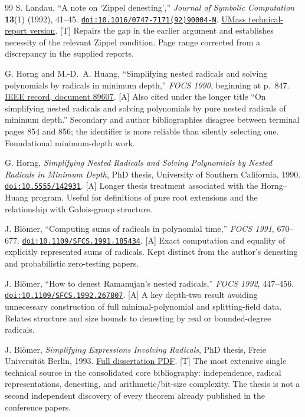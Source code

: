 \documentclass[11pt,a4paper]{article}
\numberwithin{equation}{section}
\theoremstyle{definition}\newtheorem{definition}[theorem]{Definition}
\theoremstyle{remark}\newtheorem{remark}[theorem]{Remark}
\newcommand{\doi}[1]{\href{https://doi.org/#1}{\nolinkurl{doi:#1}}}
\newcommand{\access}[2]{\href{#1}{#2}}
\newcommand{\status}[1]{\textsf{\footnotesize[#1]}}
\begin{document}
\begin{thebibliography}{99}
 S. Landau, ``A note on `Zippel denesting','' \emph{Journal of Symbolic Computation} \textbf{13}(1) (1992), 41--45. \doi{10.1016/0747-7171(92)90004-N}.
\access{https://web.cs.umass.edu/publication/docs/1990/UM-CS-1990-120.pdf}{UMass technical-report version}. \status{T}
Repairs the gap in the earlier argument and establishes necessity of the relevant Zippel condition. Page range corrected from a discrepancy in the supplied reports.

 G. Horng and M.-D.~A. Huang, ``Simplifying nested radicals and solving polynomials by radicals in minimum depth,'' \emph{FOCS 1990}, beginning at p.~847.
\access{https://ieeexplore.ieee.org/document/89607/}{IEEE record, document 89607}. \status{A}
Also cited under the longer title ``On simplifying nested radicals and solving polynomials by pure nested radicals of minimum depth.'' Secondary and author bibliographies disagree between terminal pages 854 and 856; the identifier is more reliable than silently selecting one. Foundational minimum-depth work.

 G. Horng, \emph{Simplifying Nested Radicals and Solving Polynomials by Nested Radicals in Minimum Depth}, PhD thesis, University of Southern California, 1990. \doi{10.5555/142931}. \status{A}
Longer thesis treatment associated with the Horng--Huang program. Useful for definitions of pure root extensions and the relationship with Galois-group structure.

 J. Bl\"omer, ``Computing sums of radicals in polynomial time,'' \emph{FOCS 1991}, 670--677. \doi{10.1109/SFCS.1991.185434}. \status{A}
Exact computation and equality of explicitly represented sums of radicals. Kept distinct from the author's denesting and probabilistic zero-testing papers.

 J. Bl\"omer, ``How to denest Ramanujan's nested radicals,'' \emph{FOCS 1992}, 447--456. \doi{10.1109/SFCS.1992.267807}. \status{A}
A key depth-two result avoiding unnecessary construction of full minimal-polynomial and splitting-field data. Relates structure and size bounds to denesting by real or bounded-degree radicals.

 J. Bl\"omer, \emph{Simplifying Expressions Involving Radicals}, PhD thesis, Freie Universit\"at Berlin, 1993.
\access{https://cs.nyu.edu/exact/pap/rootBounds/sumOfSqrts/bloemerThesis.pdf}{Full dissertation PDF}. \status{T}
The most extensive single technical source in the consolidated core bibliography: independence, radical representations, denesting, and arithmetic/bit-size complexity. The thesis is not a second independent discovery of every theorem already published in the conference papers.


\end{thebibliography}
\end{document}
